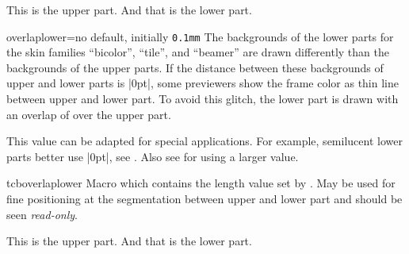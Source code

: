 \begin{dispExample}
\begin{tcolorbox}[bicolor,
  frame style={preaction={fill=blue!50!black},
    pattern=checkerboard,pattern color=blue!50!gray},
  fonttitle=\bfseries, overlaplower=0mm,
  colback=blue!10, colbacklower=white, opacitybacklower=0.65,
  title={Example for a semilucent lower part}]
This is the upper part.
\tcblower
And that is the lower part.
\end{tcolorbox}
\end{dispExample}

\clearpage

\begin{docTcbKey}[][doc new=2022-01-11]{overlaplower}{=}{no default, initially \texttt{0.1mm}}
  The backgrounds of the lower parts for the skin families \enquote{bicolor}, \enquote{tile}, and \enquote{beamer}
  are drawn differently than the backgrounds of the upper parts. If the distance between these
  backgrounds of upper and lower parts is |0pt|, some previewers show the
  frame color as thin line between upper and lower part. To avoid this glitch,
  the lower part is drawn with an overlap of  over the upper part.\par
  This value can be adapted for special applications. For example,
  semilucent lower parts better use |0pt|, see .
  Also see  for using a larger value.
\end{docTcbKey}


\begin{docCommand}[doc new=2022-01-11]{tcboverlaplower}{}
  Macro which contains the length value set by .
  May be used for fine positioning at the segmentation between upper and
  lower part and should be seen \emph{read-only}.

\begin{dispExample}
\begin{tcolorbox}[bicolor, sharp corners,
    colframe=blue!50!black, colback=blue!10, colbacklower=red!10,
    top=5mm, bottom=2mm, middle=3.5mm, overlaplower=1.5mm,
    underlay={
      \node[minimum width=1cm,minimum height=0.5cm,outer sep=auto,
        anchor=north east,fill=white] at (interior.north east)
        {\itshape\small upper};
      \node[minimum width=1cm,minimum height=0.5cm,outer sep=auto,
        anchor=north east,fill=white]
        at ([yshift=\tcboverlaplower]segmentation.east)
        {\itshape\small lower};
    }
  ]
This is the upper part.
\tcblower
And that is the lower part.
\end{tcolorbox}
\end{dispExample}

\end{docCommand}



